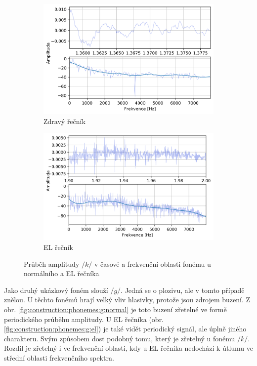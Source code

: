 \begin{figure}[htpb]
  \centering
  \begin{subfigure}[b]{0.45\textwidth}
    \includegraphics[width=\textwidth]{./ch5-construction/img/signal-normal_k.png}
    \caption{Zdravý řečník}
    \label{fig:construction:phonemes:k:normal}
  \end{subfigure}
  \begin{subfigure}[b]{0.45\textwidth}
    \includegraphics[width=\textwidth]{./ch5-construction/img/signal-el_k.png}
    \caption{EL řečník}
    \label{fig:construction:phonemes:k:el}
  \end{subfigure}
  \caption{Průběh amplitudy $/k/$ v časové a frekvenční oblasti fonému u normálního a EL řečníka}
  \label{fig:construction:phonemes:k}
\end{figure}

Jako druhý ukázkový foném slouží $/g/$. Jedná se o plozivu, ale v tomto případě znělou. U těchto fonémů hrají velký vliv hlasivky, protože jsou zdrojem buzení. Z obr. \ref{fig:construction:phonemes:g:normal} je toto buzení zřetelné ve formě periodického průběhu amplitudy. U EL řečníka (obr. \ref{fig:construction:phonemes:g:el}) je také vidět periodický signál, ale úplně jiného charakteru. Svým způsobem dost podobný tomu, který je zřetelný u fonému $/k/$. Rozdíl je zřetelný i ve frekvenční oblasti, kdy u EL řečníka nedochází k útlumu ve střední oblasti frekvenčního spektra.

